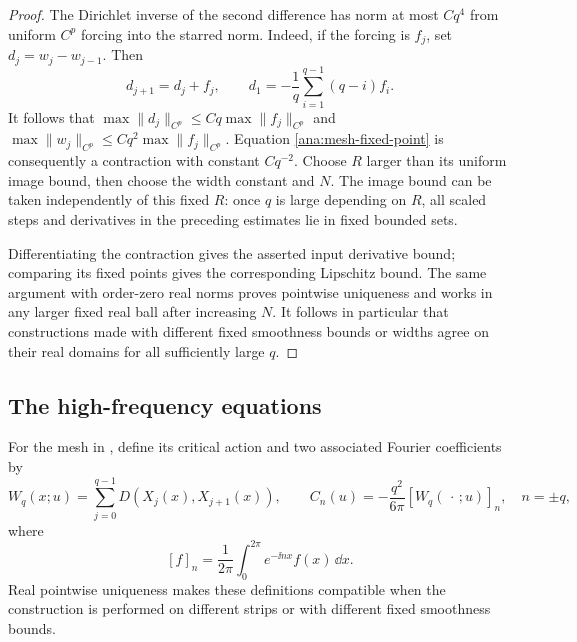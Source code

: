 \begin{proof}
The Dirichlet inverse of the second difference has norm at most
\(Cq^4\) from uniform \(C^p\) forcing into the starred norm.
Indeed, if the forcing is \(f_j\), set \(d_j=w_j-w_{j-1}\).
Then
\[
d_{j+1}=d_j+f_j,\qquad
d_1=-\frac1q\sum_{i=1}^{q-1}(q-i)f_i.
\]
It follows that \(\max\|d_j\|_{C^p}\le Cq\max\|f_j\|_{C^p}\)
and \(\max\|w_j\|_{C^p}\le Cq^2\max\|f_j\|_{C^p}\).
Equation \eqref{ana:mesh-fixed-point} is consequently a contraction
with constant \(Cq^{-2}\).  Choose \(R\) larger than its uniform
image bound, then choose the width constant and \(N\).
The image bound can be taken independently of this fixed \(R\):
once \(q\) is large depending on \(R\), all scaled steps and
derivatives in the preceding estimates lie in fixed bounded sets.

Differentiating the contraction gives the asserted input derivative
bound; comparing its fixed points gives the corresponding Lipschitz
bound.  The same argument with order-zero real norms proves pointwise
uniqueness and works in any larger fixed real ball after increasing
\(N\).  It follows in particular that constructions made with different
fixed smoothness bounds or widths agree on their real domains for all
sufficiently large \(q\).
\end{proof}

\subsection{The high-frequency equations}

For the mesh in , define its critical action and
two associated Fourier coefficients by
\begin{equation}\label{ana:constraint-definition}
W_q(x;u)=\sum_{j=0}^{q-1}D(X_j(x),X_{j+1}(x)),\qquad
C_n(u)=-\frac{q^2}{6\pi}[W_q(\,\cdot\,;u)]_n,\quad n=\pm q,
\end{equation}
where
\[
[f]_n=\frac1{2\pi}\int_0^{2\pi}e^{-\ii nx}f(x)\,\dd x.
\]
Real pointwise uniqueness makes these definitions compatible when
the construction is performed on different strips or with different
fixed smoothness bounds.

